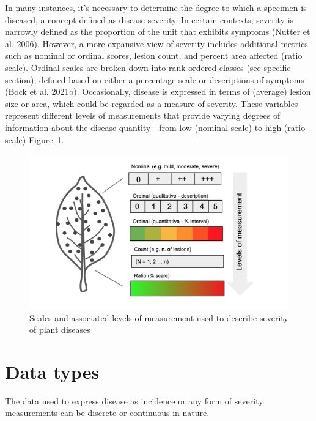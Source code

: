 \documentclass[
  letterpaper,
]{book}
\begin{document}
In many instances, it's necessary to determine the degree to which a
specimen is diseased, a concept defined as disease severity. In certain
contexts, severity is narrowly defined as the proportion of the unit
that exhibits symptoms (Nutter et al. 2006). However, a more expansive
view of severity includes additional metrics such as nominal or ordinal
scores, lesion count, and percent area affected (ratio scale). Ordinal
scales are broken down into rank-ordered classes (see specific
\href{data-ordinal.html}{section}), defined based on either a percentage
scale or descriptions of symptoms (Bock et al. 2021b). Occasionally,
disease is expressed in terms of (average) lesion size or area, which
could be regarded as a measure of severity. These variables represent
different levels of measurements that provide varying degrees of
information about the disease quantity - from low (nominal scale) to
high (ratio scale) Figure~\ref{fig-severity}.

\begin{figure}

{\centering \includegraphics[width=5.32292in,height=\textheight]{imgs/severity.png}

}

\caption{\label{fig-severity}Scales and associated levels of measurement
used to describe severity of plant diseases}

\end{figure}

\hypertarget{data-types}{%
\section{Data types}\label{data-types}}

The data used to express disease as incidence or any form of severity
measurements can be discrete or continuous in nature.
\end{document}

